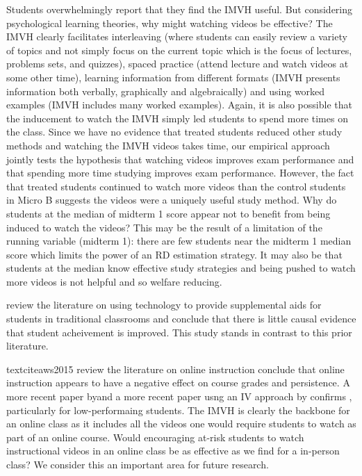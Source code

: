 \documentclass[12pt]{article}
\begin{document}
Students overwhelmingly report that they find the IMVH useful. But considering psychological learning theories, why might watching videos be effective?  The IMVH clearly facilitates interleaving (where students can easily review a variety of topics and not simply focus on the current topic which is the focus of lectures, problems sets, and quizzes), spaced practice (attend lecture and watch videos at some other time), learning information from different formats (IMVH presents information both verbally, graphically and algebraically) and using worked examples (IMVH includes many worked examples).  Again, it is also possible that the inducement to watch the IMVH simply led students to spend more times on the class.  Since we have no evidence that treated students reduced other study methods and watching the IMVH videos takes time, our empirical approach jointly tests the hypothesis that watching videos improves exam performance and that spending more time studying improves exam performance. However, the fact that treated students continued to watch more videos than the control students in Micro B suggests the videos were a uniquely useful study method.  Why do students at the median of midterm 1 score appear not to benefit from being induced to watch the videos?   This may be the result of a limitation of the running variable (midterm 1): there are few students near the midterm 1 median score which limits the power of an RD estimation strategy.  It may also be that students at the median know effective study strategies and being pushed to watch more videos is not helpful and so welfare reducing.  

\textcite{aws2015} review the literature on using technology to provide supplemental aids for students in traditional classrooms and conclude that there is little causal evidence that student acheivement is improved.  This study stands in contrast to this prior literature.

textcite{aws2015} review the literature on online instruction conclude that online instruction appears to have a negative effect on course grades and persistence.  A more recent paper byand a more recent paper usng an IV approach by \textcite{bflt2017} confirms , particularly for low-performaing students.  The IMVH is clearly the backbone for an online class as it includes all the videos one would require students to watch as part of an online course.  Would encouraging at-risk students to watch instructional videos in an online class be as effective as we find for a in-person class?  We consider this an important area for future research.   
\end{document}
